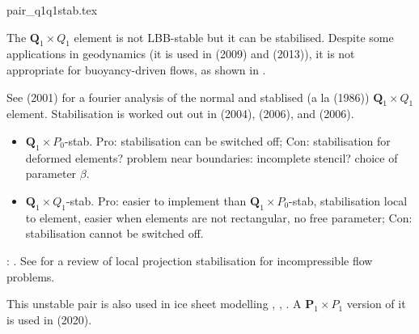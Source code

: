 \begin{flushright} {\tiny {\color{gray} pair\_q1q1stab.tex}} \end{flushright}

\begin{minipage}[t]{0.5\textwidth}

\end{minipage}
\begin{minipage}[t]{0.5\textwidth}

\end{minipage}

The ${\bm Q}_1\times Q_1$ element is not LBB-stable but it can be stabilised. Despite
some applications in geodynamics (it is used in \textcite{bugs09} (2009) 
and \textcite{busa13} (2013)), it is not appropriate for buoyancy-driven flows, 
as shown in \textcite{thba22}.

See \textcite{nosi01} (2001) for a fourier analysis of the normal 
and stablised (a la \textcite{hufb86} (1986)) ${\bm Q}_1\times Q_1$ element.
Stabilisation is worked out out in \textcite{dobo04} (2004), \textcite{bodg06} (2006), 
and \textcite{bodo06} (2006).

\begin{itemize}
\item 
${\bm Q}_1\times P_0$-stab. Pro: stabilisation can be switched off; Con: stabilisation for deformed elements? 
problem near boundaries: incomplete stencil? choice of parameter $\beta$.
\item 
${\bm Q}_1\times Q_1$-stab. Pro: easier to implement than ${\bm Q}_1\times P_0$-stab, stabilisation local to element, 
easier when elements are not rectangular, no free parameter; Con: stabilisation cannot be switched off.
\end{itemize}

\Literature: \textcite{shry78,temr92,tezd92,grcc95,idsn95,knto00,fros07,lihc09}. 
See \textcite{brlu09} for a review of local projection stabilisation for incompressible flow problems. 

This unstable pair is also used in ice sheet modelling \textcite{heah18} , \textcite{zhjg11}, 
\textcite{zwgg07}. A ${\bm P}_1\times P_1$ version of it is used in \textcite{kahp20} (2020).



